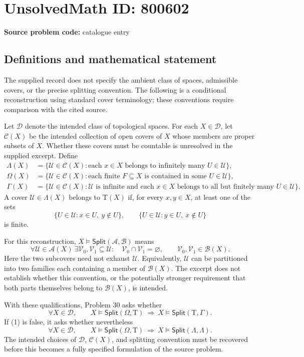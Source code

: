 \documentclass[11pt]{article}
\begin{document}
\section*{UnsolvedMath ID: 800602}
\textbf{Source problem code:} catalogue entry
\subsection{Definitions and mathematical statement}
The supplied record does not specify the ambient class of spaces, admissible covers, or the precise splitting convention. The following is a conditional reconstruction using standard cover terminology; these conventions require comparison with the cited source.

Let \(\mathcal D\) denote the intended class of topological spaces. For each \(X\in\mathcal D\), let \(\mathcal C(X)\) be the intended collection of open covers of \(X\) whose members are proper subsets of \(X\). Whether these covers must be countable is unresolved in the supplied excerpt. Define
\[
\begin{aligned}
\Lambda(X)&=\{\mathcal U\in\mathcal C(X):\text{each }x\in X\text{ belongs to infinitely many }U\in\mathcal U\},\\
\Omega(X)&=\{\mathcal U\in\mathcal C(X):\text{each finite }F\subseteq X\text{ is contained in some }U\in\mathcal U\},\\
\Gamma(X)&=\{\mathcal U\in\mathcal C(X):\mathcal U\text{ is infinite and each }x\in X\text{ belongs to all but finitely many }U\in\mathcal U\}.
\end{aligned}
\]
A cover \(\mathcal U\in\Lambda(X)\) belongs to \(\mathrm T(X)\) if, for every \(x,y\in X\), at least one of the sets
\[
\{U\in\mathcal U:x\in U,\ y\notin U\},\qquad
\{U\in\mathcal U:y\in U,\ x\notin U\}
\]
is finite.

For this reconstruction, \(X\models\mathsf{Split}(\mathcal A,\mathcal B)\) means
\[
\forall\mathcal U\in\mathcal A(X)\ \exists\mathcal V_0,\mathcal V_1\subseteq\mathcal U:
\quad \mathcal V_0\cap\mathcal V_1=\varnothing,
\qquad \mathcal V_0,\mathcal V_1\in\mathcal B(X).
\]
Here the two subcovers need not exhaust \(\mathcal U\). Equivalently, \(\mathcal U\) can be partitioned into two families each containing a member of \(\mathcal B(X)\). The excerpt does not establish whether this convention, or the potentially stronger requirement that both parts themselves belong to \(\mathcal B(X)\), is intended.

With these qualifications, Problem 30 asks whether
\[
\forall X\in\mathcal D,\qquad
X\models\mathsf{Split}(\Omega,\mathrm T)
\ \Longrightarrow\
X\models\mathsf{Split}(\mathrm T,\Gamma).
\tag{1}
\]
If (1) is false, it asks whether nevertheless
\[
\forall X\in\mathcal D,\qquad
X\models\mathsf{Split}(\Omega,\mathrm T)
\ \Longrightarrow\
X\models\mathsf{Split}(\Lambda,\Lambda).
\tag{2}
\]
The intended choices of \(\mathcal D\), \(\mathcal C(X)\), and splitting convention must be recovered before this becomes a fully specified formulation of the source problem.
\end{document}
